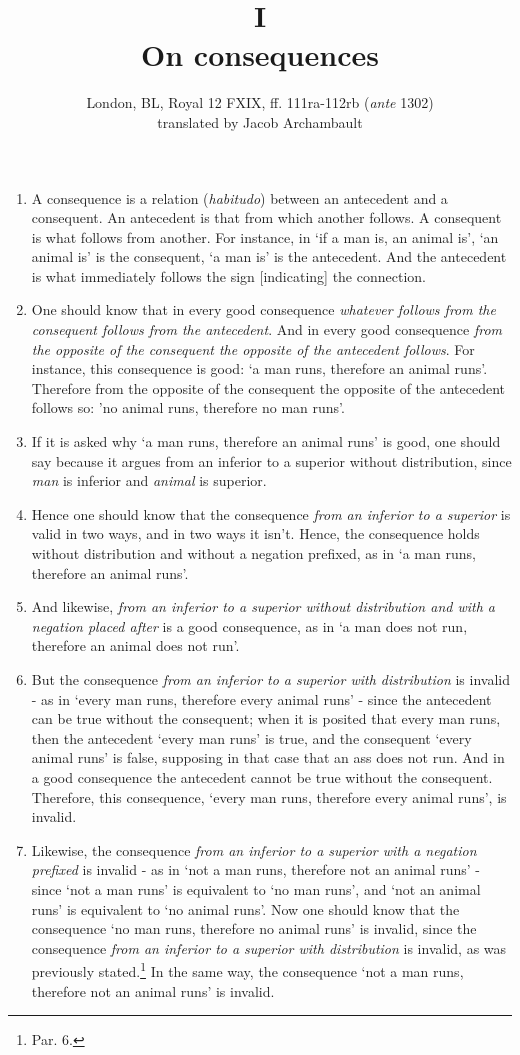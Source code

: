 \documentclass[]{article}
\title{I
\\ On consequences}
\author{London, BL, Royal 12 FXIX, ff. 111ra-112rb (\textit{ante} 1302)\\translated by Jacob Archambault}
\begin{document}
\maketitle
\begin{enumerate}
\item[1.] A consequence is a relation (\textit{habitudo}) between an antecedent and a consequent. An antecedent is that from which another follows. A consequent is what follows from another. For instance, in `if a man is, an animal is', `an animal is' is the consequent, `a man is' is the antecedent. And the antecedent is what immediately follows the sign [indicating] the connection.
\item[2.] One should know that in every good consequence \textit{whatever follows from the consequent follows from the antecedent}. And in every good consequence \textit{from the opposite of the consequent the opposite of the antecedent follows}. For instance, this consequence is good: `a man runs, therefore an animal runs'. Therefore from the opposite of the consequent the opposite of the antecedent follows so: 'no animal runs, therefore no man runs'.
\item[3.] If it is asked why `a man runs, therefore an animal runs' is good, one should say because it argues from an inferior to a superior without distribution, since \textit{man} is inferior and \textit{animal} is superior.
\item[4.] Hence one should know that the consequence \textit{from an inferior to a superior} is valid in two ways, and in two ways it isn't. Hence, the consequence holds without distribution and without a negation prefixed, as in `a man runs, therefore an animal runs'.
\item[5.] And likewise, \textit{from an inferior to a superior without distribution and with a negation placed after} is a good consequence, as in `a man does not run, therefore an animal does not run'.
\item[6.] But the consequence \textit{from an inferior to a superior with distribution} is invalid - as in `every man runs, therefore every animal runs' - since the antecedent can be true without the consequent; when it is posited that every man runs, then the antecedent `every man runs' is true, and the consequent `every animal runs' is false, supposing in that case that an ass does not run. And in a good consequence the antecedent cannot be true without the consequent. Therefore, this consequence, `every man runs, therefore every animal runs', is invalid. 
\item[7.] Likewise, the consequence \textit{from an inferior to a superior with a negation prefixed} is invalid - as in `not a man runs, therefore not an animal runs' - since `not a man runs' is equivalent to `no man runs', and `not an animal runs' is equivalent to `no animal runs'. Now one should know that the consequence `no man runs, therefore no animal runs' is invalid, since the consequence \textit{from an inferior to a superior with distribution} is invalid, as was previously stated.\footnote{Par. 6.} In the same way, the consequence `not a man runs, therefore not an animal runs' is invalid.

\end{enumerate}
\end{document}
